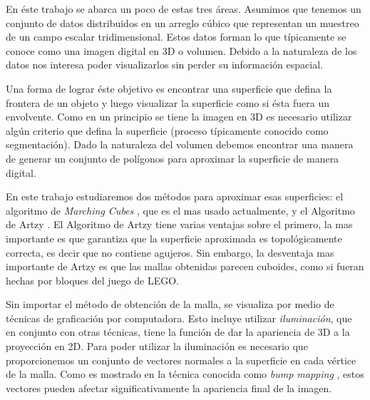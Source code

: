 En éste trabajo se abarca un poco de estas tres áreas. Asumimos que tenemos un conjunto de datos distribuidos en un arreglo cúbico que representan un muestreo de un campo escalar tridimensional. Estos datos forman lo que típicamente se conoce como una imagen digital en 3D o volumen. Debido a la naturaleza de los datos nos interesa poder visualizarlos sin perder su información espacial.

Una forma de lograr éste objetivo es encontrar una superficie que defina la frontera de un objeto y luego visualizar la superficie como si ésta fuera un envolvente. Como en un principio se tiene la imagen en 3D es necesario utilizar algún criterio que defina la superficie (proceso típicamente conocido como segmentación). Dado la naturaleza del volumen debemos encontrar una manera de generar un conjunto de polígonos para aproximar la superficie de manera digital.

En este trabajo estudiaremos dos métodos para aproximar esas superficies: el algoritmo de \emph{Marching Cubes} \cite{MarchingCubes}, que es el mas usado actualmente, y el Algoritmo de Artzy \cite{artzyCorto}. El Algoritmo de Artzy tiene varias ventajas sobre el primero, la mas importante es que garantiza que la superficie aproximada es topológicamente correcta, es decir que no contiene agujeros. Sin embargo, la desventaja mas importante de Artzy es que las mallas obtenidas parecen cuboides, como si fueran hechas por bloques del juego de LEGO.%

Sin importar el método de obtención de la malla, se visualiza por medio de técnicas de graficación por computadora. Esto incluye utilizar \emph{iluminación}, que en conjunto con otras técnicas, tiene la función de dar la apariencia de 3D a la proyección en 2D. Para poder utilizar la iluminación es necesario que proporcionemos un conjunto de vectores normales a la superficie en cada vértice de la malla. Como es mostrado en la técnica conocida como \emph{bump mapping} \cite{bussCG}, estos vectores pueden afectar significativamente la apariencia final de la imagen.

